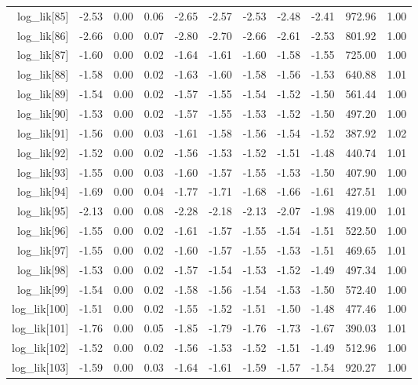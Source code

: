 \begin{table}[ht]
\begin{tabular}{rrrrrrrrrrr}
  log\_lik[85] & -2.53 & 0.00 & 0.06 & -2.65 & -2.57 & -2.53 & -2.48 & -2.41 & 972.96 & 1.00 \\ 
  log\_lik[86] & -2.66 & 0.00 & 0.07 & -2.80 & -2.70 & -2.66 & -2.61 & -2.53 & 801.92 & 1.00 \\ 
  log\_lik[87] & -1.60 & 0.00 & 0.02 & -1.64 & -1.61 & -1.60 & -1.58 & -1.55 & 725.00 & 1.00 \\ 
  log\_lik[88] & -1.58 & 0.00 & 0.02 & -1.63 & -1.60 & -1.58 & -1.56 & -1.53 & 640.88 & 1.01 \\ 
  log\_lik[89] & -1.54 & 0.00 & 0.02 & -1.57 & -1.55 & -1.54 & -1.52 & -1.50 & 561.44 & 1.00 \\ 
  log\_lik[90] & -1.53 & 0.00 & 0.02 & -1.57 & -1.55 & -1.53 & -1.52 & -1.50 & 497.20 & 1.00 \\ 
  log\_lik[91] & -1.56 & 0.00 & 0.03 & -1.61 & -1.58 & -1.56 & -1.54 & -1.52 & 387.92 & 1.02 \\ 
  log\_lik[92] & -1.52 & 0.00 & 0.02 & -1.56 & -1.53 & -1.52 & -1.51 & -1.48 & 440.74 & 1.01 \\ 
  log\_lik[93] & -1.55 & 0.00 & 0.03 & -1.60 & -1.57 & -1.55 & -1.53 & -1.50 & 407.90 & 1.00 \\ 
  log\_lik[94] & -1.69 & 0.00 & 0.04 & -1.77 & -1.71 & -1.68 & -1.66 & -1.61 & 427.51 & 1.00 \\ 
  log\_lik[95] & -2.13 & 0.00 & 0.08 & -2.28 & -2.18 & -2.13 & -2.07 & -1.98 & 419.00 & 1.01 \\ 
  log\_lik[96] & -1.55 & 0.00 & 0.02 & -1.61 & -1.57 & -1.55 & -1.54 & -1.51 & 522.50 & 1.00 \\ 
  log\_lik[97] & -1.55 & 0.00 & 0.02 & -1.60 & -1.57 & -1.55 & -1.53 & -1.51 & 469.65 & 1.01 \\ 
  log\_lik[98] & -1.53 & 0.00 & 0.02 & -1.57 & -1.54 & -1.53 & -1.52 & -1.49 & 497.34 & 1.00 \\ 
  log\_lik[99] & -1.54 & 0.00 & 0.02 & -1.58 & -1.56 & -1.54 & -1.53 & -1.50 & 572.40 & 1.00 \\ 
  log\_lik[100] & -1.51 & 0.00 & 0.02 & -1.55 & -1.52 & -1.51 & -1.50 & -1.48 & 477.46 & 1.00 \\ 
  log\_lik[101] & -1.76 & 0.00 & 0.05 & -1.85 & -1.79 & -1.76 & -1.73 & -1.67 & 390.03 & 1.01 \\ 
  log\_lik[102] & -1.52 & 0.00 & 0.02 & -1.56 & -1.53 & -1.52 & -1.51 & -1.49 & 512.96 & 1.00 \\ 
  log\_lik[103] & -1.59 & 0.00 & 0.03 & -1.64 & -1.61 & -1.59 & -1.57 & -1.54 & 920.27 & 1.00 \\ 

\end{tabular}
\end{table}
